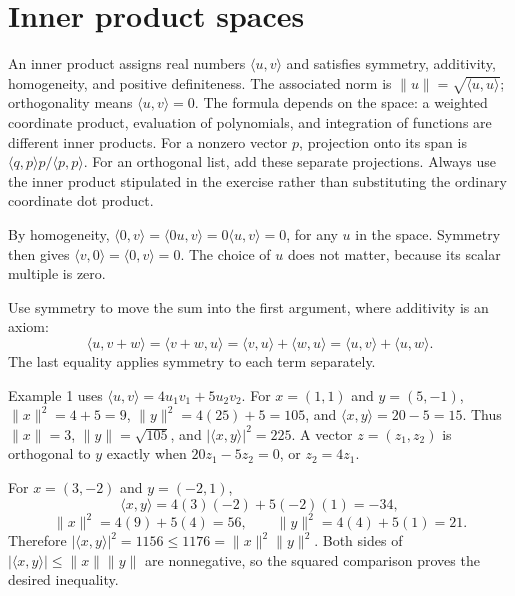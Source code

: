\section{Inner product spaces}
An inner product assigns real numbers $\langle u,v\rangle$ and
satisfies symmetry, additivity, homogeneity, and positive definiteness.
The associated norm is $\|u\|=\sqrt{\langle u,u\rangle}$;
orthogonality means $\langle u,v\rangle=0$. The formula depends
on the space: a weighted coordinate product, evaluation of polynomials,
and integration of functions are different inner products.
For a nonzero vector $p$, projection onto its span is
$\langle q,p\rangle p/\langle p,p\rangle$.
For an orthogonal list, add these separate projections. Always use
the inner product stipulated in the exercise rather than substituting
the ordinary coordinate dot product.

By homogeneity, $\langle0,v\rangle=\langle0u,v\rangle
=0\langle u,v\rangle=0$, for any $u$ in the space.
Symmetry then gives $\langle v,0\rangle=\langle0,v\rangle=0$.
The choice of $u$ does not matter, because its scalar multiple is zero.

Use symmetry to move the sum into the first argument, where additivity
is an axiom:
\[
 \langle u,v+w\rangle=\langle v+w,u\rangle
 =\langle v,u\rangle+\langle w,u\rangle
 =\langle u,v\rangle+\langle u,w\rangle.
\]
The last equality applies symmetry to each term separately.

Example 1 uses $\langle u,v\rangle=4u_1v_1+5u_2v_2$.
For $x=(1,1)$ and $y=(5,-1)$,
$\|x\|^2=4+5=9$, $\|y\|^2=4(25)+5=105$,
and $\langle x,y\rangle=20-5=15$.
Thus $\|x\|=3$, $\|y\|=\sqrt{105}$, and
$|\langle x,y\rangle|^2=225$.
A vector $z=(z_1,z_2)$ is orthogonal to $y$ exactly when
$20z_1-5z_2=0$, or $z_2=4z_1$.

For $x=(3,-2)$ and $y=(-2,1)$,
\[
 \langle x,y\rangle=4(3)(-2)+5(-2)(1)=-34,
\]
\[
 \|x\|^2=4(9)+5(4)=56,\qquad
 \|y\|^2=4(4)+5(1)=21.
\]
Therefore $|\langle x,y\rangle|^2=1156\le1176=\|x\|^2\|y\|^2$.
Both sides of $|\langle x,y\rangle|\le\|x\|\|y\|$ are nonnegative,
so the squared comparison proves the desired inequality.

